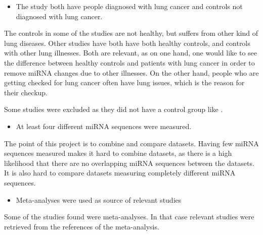 \begin{itemize}
    \item The study both have people diagnosed with lung cancer and controls not diagnosed with lung cancer.
\end{itemize}

The controls in some of the studies are not healthy, but suffers from other kind of lung diseases. Other studies have both have both healthy controls, and controls with other lung illnesses. Both are relevant, as on one hand, one would like to see the difference between healthy controls and patients with lung cancer in order to remove miRNA changes due to other illnesses. On the other hand, people who are getting checked for lung cancer often have lung issues, which is the reason for their checkup.

Some studies were excluded as they did not have a control group like \citet{Mitchell2017}.

\begin{itemize}
    \item At least four different miRNA sequences were measured.
\end{itemize}

The point of this project is to combine and compare datasets. Having few miRNA sequences measured makes it hard to combine datasets, as there is a high likelihood that there are no overlapping miRNA sequences between the datasets. It is also hard to compare datasets measuring completely different miRNA sequences.

\begin{itemize}
    \item Meta-analyses were used as source of relevant studies
\end{itemize}

Some of the studies found were meta-analyses. In that case relevant studies were retrieved from the references of the meta-analysis.

